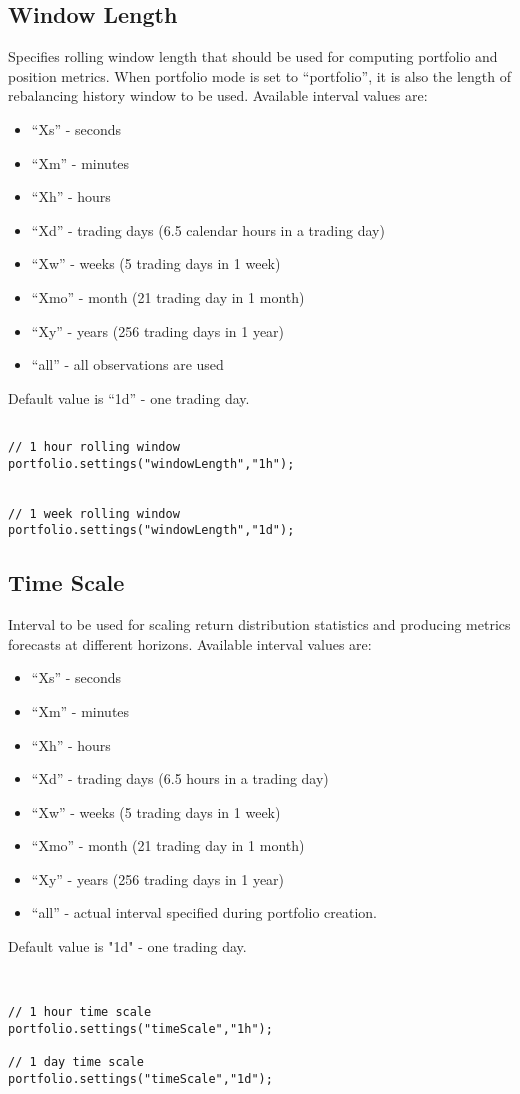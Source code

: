 \documentclass[letterpaper]{report}
\begin{document}
\subsection{Window Length}
Specifies rolling window length that should be used for computing portfolio and position metrics. 
When portfolio mode is set to ``portfolio'', it is also the length of rebalancing history window to be used.
Available interval values are:
  \begin{itemize} 
\item ``Xs'' - seconds
\item ``Xm'' - minutes
\item ``Xh'' - hours
\item ``Xd'' - trading days (6.5 calendar hours in a trading day)
\item ``Xw'' - weeks (5 trading days in 1 week)
\item ``Xmo'' - month (21 trading day in 1 month)
\item ``Xy'' - years (256 trading days in 1 year)
\item ``all'' - all observations are used
\end{itemize}
Default value is ``1d'' - one trading day.
\begin{lstlisting}

// 1 hour rolling window
portfolio.settings("windowLength","1h");


// 1 week rolling window
portfolio.settings("windowLength","1d");

\end{lstlisting}

\subsection{Time Scale}
Interval to be used for scaling return distribution statistics and producing metrics forecasts at different horizons. Available interval values are: 
  \begin{itemize} 
\item ``Xs'' - seconds
\item ``Xm'' - minutes
\item ``Xh'' - hours
\item ``Xd'' - trading days (6.5 hours in a trading day)
\item ``Xw'' - weeks (5 trading days in 1 week)
\item ``Xmo'' - month (21 trading day in 1 month)
\item ``Xy'' - years (256 trading days in 1 year)
\item ``all'' - actual interval specified during portfolio creation.
\end{itemize}
Default value is "1d" - one trading day.
\begin{lstlisting}


// 1 hour time scale 
portfolio.settings("timeScale","1h");

// 1 day time scale
portfolio.settings("timeScale","1d");

\end{lstlisting}
\end{document}
